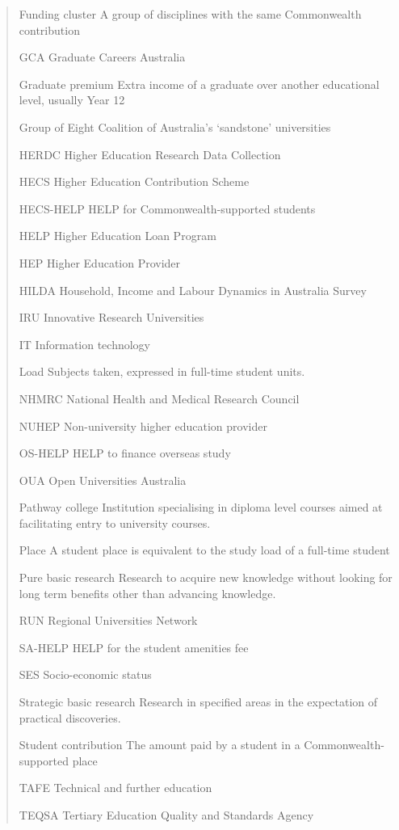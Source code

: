 \documentclass{grattan}
\begin{document}
\begin{quote}
Funding cluster A group of disciplines with the same Commonwealth contribution

GCA Graduate Careers Australia

Graduate premium Extra income of a graduate over another educational level, usually Year 12

Group of Eight Coalition of Australia's `sandstone' universities

HERDC Higher Education Research Data Collection

HECS Higher Education Contribution Scheme

HECS-HELP HELP for Commonwealth-supported students

HELP Higher Education Loan Program

HEP Higher Education Provider

HILDA Household, Income and Labour Dynamics in Australia Survey

IRU Innovative Research Universities

IT Information technology

Load Subjects taken, expressed in full-time student units.

NHMRC National Health and Medical Research Council

NUHEP Non-university higher education provider

OS-HELP HELP to finance overseas study

OUA Open Universities Australia

Pathway college Institution specialising in diploma level courses aimed at facilitating entry to university courses.

Place A student place is equivalent to the study load of a full-time student

Pure basic research Research to acquire new knowledge without looking for long term benefits other than advancing knowledge.

RUN Regional Universities Network

SA-HELP HELP for the student amenities fee

SES Socio-economic status

Strategic basic research Research in specified areas in the expectation of practical discoveries.

Student contribution The amount paid by a student in a Commonwealth-supported place

TAFE Technical and further education

TEQSA Tertiary Education Quality and Standards Agency
\end{quote}
\end{document}
